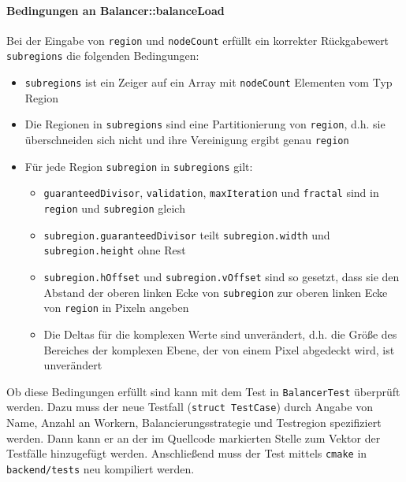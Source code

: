 \paragraph*{Bedingungen an Balancer::balanceLoad}
Bei der Eingabe von \verb|region| und \verb|nodeCount| erfüllt ein korrekter Rückgabewert \verb|subregions| die folgenden Bedingungen:
\begin{itemize}
	\item \verb|subregions| ist ein Zeiger auf ein Array mit \verb|nodeCount| Elementen vom Typ Region
	\item Die Regionen in \verb|subregions| sind eine Partitionierung von \verb|region|, d.h. sie überschneiden sich nicht und ihre Vereinigung ergibt genau \verb|region|
	\item Für jede Region \verb|subregion| in \verb|subregions| gilt:
	      \begin{itemize}
		      \item \verb|guaranteedDivisor|, \verb|validation|, \verb|maxIteration| und \verb|fractal| sind in \verb|region| und \verb|subregion| gleich
		      \item \verb|subregion.guaranteedDivisor| teilt \verb|subregion.width| und \\ \verb|subregion.height| ohne Rest
		      \item \verb|subregion.hOffset| und \verb|subregion.vOffset| sind so gesetzt, dass sie den Abstand der oberen linken Ecke von \verb|subregion| zur oberen linken Ecke von \verb|region| in Pixeln angeben
		      \item Die Deltas für die komplexen Werte sind unverändert, d.h. die Größe des Bereiches der komplexen Ebene, der von einem Pixel abgedeckt wird, ist unverändert
	      \end{itemize}
\end{itemize}

Ob diese Bedingungen erfüllt sind kann mit dem Test in \verb|BalancerTest| überprüft werden.
Dazu muss der neue Testfall (\verb|struct TestCase|) durch Angabe von Name, Anzahl an Workern, Balancierungsstrategie und Testregion spezifiziert werden.
Dann kann er an der im Quellcode markierten Stelle zum Vektor der Testfälle hinzugefügt werden.
Anschließend muss der Test mittels \verb|cmake| in \verb|backend/tests| neu kompiliert werden.

